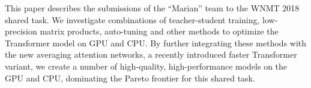 This paper describes the submissions of the ``Marian'' team to the WNMT 2018 shared task. We investigate combinations of teacher-student training, low-precision matrix products, auto-tuning and other methods to optimize the Transformer model on GPU and CPU. By further integrating these methods with the new averaging attention networks, a recently introduced faster Transformer variant, we create a number of high-quality, high-performance models on the GPU and CPU, dominating the Pareto frontier for this shared task.
